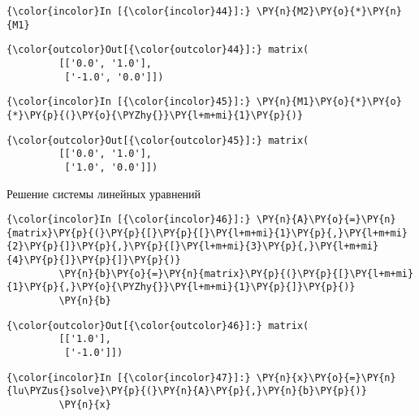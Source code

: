     \begin{Verbatim}[commandchars=\\\{\}]
{\color{incolor}In [{\color{incolor}44}]:} \PY{n}{M2}\PY{o}{*}\PY{n}{M1}
\end{Verbatim}

            \begin{Verbatim}[commandchars=\\\{\}]
{\color{outcolor}Out[{\color{outcolor}44}]:} matrix(
         [['0.0', '1.0'],
          ['-1.0', '0.0']])
\end{Verbatim}
        
    \begin{Verbatim}[commandchars=\\\{\}]
{\color{incolor}In [{\color{incolor}45}]:} \PY{n}{M1}\PY{o}{*}\PY{o}{*}\PY{p}{(}\PY{o}{\PYZhy{}}\PY{l+m+mi}{1}\PY{p}{)}
\end{Verbatim}

            \begin{Verbatim}[commandchars=\\\{\}]
{\color{outcolor}Out[{\color{outcolor}45}]:} matrix(
         [['0.0', '1.0'],
          ['1.0', '0.0']])
\end{Verbatim}
        
    Решение системы линейных уравнений

    \begin{Verbatim}[commandchars=\\\{\}]
{\color{incolor}In [{\color{incolor}46}]:} \PY{n}{A}\PY{o}{=}\PY{n}{matrix}\PY{p}{(}\PY{p}{[}\PY{p}{[}\PY{l+m+mi}{1}\PY{p}{,}\PY{l+m+mi}{2}\PY{p}{]}\PY{p}{,}\PY{p}{[}\PY{l+m+mi}{3}\PY{p}{,}\PY{l+m+mi}{4}\PY{p}{]}\PY{p}{]}\PY{p}{)}
         \PY{n}{b}\PY{o}{=}\PY{n}{matrix}\PY{p}{(}\PY{p}{[}\PY{l+m+mi}{1}\PY{p}{,}\PY{o}{\PYZhy{}}\PY{l+m+mi}{1}\PY{p}{]}\PY{p}{)}
         \PY{n}{b}
\end{Verbatim}

            \begin{Verbatim}[commandchars=\\\{\}]
{\color{outcolor}Out[{\color{outcolor}46}]:} matrix(
         [['1.0'],
          ['-1.0']])
\end{Verbatim}
        
    \begin{Verbatim}[commandchars=\\\{\}]
{\color{incolor}In [{\color{incolor}47}]:} \PY{n}{x}\PY{o}{=}\PY{n}{lu\PYZus{}solve}\PY{p}{(}\PY{n}{A}\PY{p}{,}\PY{n}{b}\PY{p}{)}
         \PY{n}{x}
\end{Verbatim}


